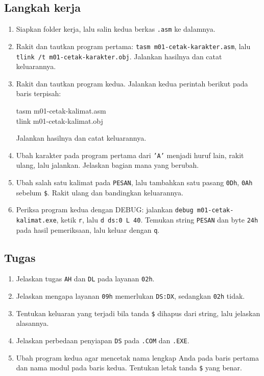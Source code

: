 \subsection{Langkah kerja}

\begin{enumerate}
    \item Siapkan folder kerja, lalu salin kedua berkas
          \texttt{.asm} ke dalamnya.
    \item Rakit dan tautkan program pertama:
          \texttt{tasm m01-cetak-karakter.asm}, lalu
          \texttt{tlink /t m01-cetak-karakter.obj}. Jalankan
          hasilnya dan catat keluarannya.
    \item Rakit dan tautkan program kedua. Jalankan kedua perintah
          berikut pada baris terpisah:
          \begin{perintah}
tasm m01-cetak-kalimat.asm\\
tlink m01-cetak-kalimat.obj
\end{perintah}
          Jalankan hasilnya dan catat keluarannya.
    \item Ubah karakter pada program pertama dari \texttt{'A'} menjadi
          huruf lain, rakit ulang, lalu jalankan. Jelaskan bagian mana
          yang berubah.
    \item Ubah salah satu kalimat pada \texttt{PESAN}, lalu tambahkan
          satu pasang \texttt{0Dh}, \texttt{0Ah} sebelum \texttt{\$}.
          Rakit ulang dan bandingkan keluarannya.
    \item Periksa program kedua dengan DEBUG: jalankan
          \texttt{debug m01-cetak-kalimat.exe}, ketik \texttt{r},
          lalu \texttt{d ds:0 L 40}. Temukan string \texttt{PESAN}
          dan byte \texttt{24h} pada hasil pemeriksaan, lalu keluar
          dengan \texttt{q}.
\end{enumerate}

\subsection{Tugas}

\begin{enumerate}
    \item Jelaskan tugas \texttt{AH} dan \texttt{DL} pada layanan
          \texttt{02h}.
    \item Jelaskan mengapa layanan \texttt{09h} memerlukan
          \texttt{DS:DX}, sedangkan \texttt{02h} tidak.
    \item Tentukan keluaran yang terjadi bila tanda \texttt{\$}
          dihapus dari string, lalu jelaskan alasannya.
    \item Jelaskan perbedaan penyiapan \texttt{DS} pada
          \texttt{.COM} dan \texttt{.EXE}.
    \item Ubah program kedua agar mencetak nama lengkap Anda pada
          baris pertama dan nama modul pada baris kedua. Tentukan
          letak tanda \texttt{\$} yang benar.
\end{enumerate}


